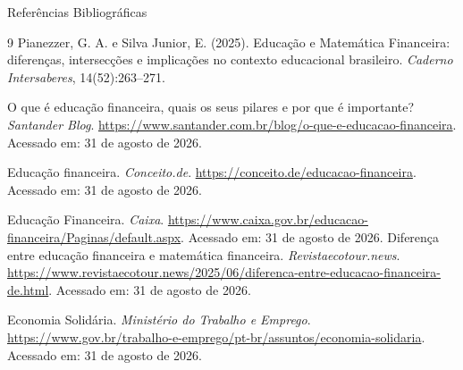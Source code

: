 \documentclass{if-beamer}
\begin{document}
\begin{frame}[allowframebreaks]{Referências Bibliográficas}
    \begin{thebibliography}{9}
        Pianezzer, G. A. e Silva Junior, E. (2025). Educação e Matemática Financeira: diferenças, intersecções e implicações no contexto educacional brasileiro. \textit{Caderno Intersaberes}, 14(52):263--271.

        O que é educação financeira, quais os seus pilares e por que é importante? \textit{Santander Blog}. \url{https://www.santander.com.br/blog/o-que-e-educacao-financeira}. Acessado em: 31 de agosto de 2026.

        Educação financeira. \textit{Conceito.de}. \url{https://conceito.de/educacao-financeira}. Acessado em: 31 de agosto de 2026.

        Educação Financeira. \textit{Caixa}. \url{https://www.caixa.gov.br/educacao-financeira/Paginas/default.aspx}. Acessado em: 31 de agosto de 2026.
%
%
        Diferença entre educação financeira e matemática financeira. \textit{Revistaecotour.news}. \url{https://www.revistaecotour.news/2025/06/diferenca-entre-educacao-financeira-de.html}. Acessado em: 31 de agosto de 2026.

%
        Economia Solidária. \textit{Ministério do Trabalho e Emprego}. \url{https://www.gov.br/trabalho-e-emprego/pt-br/assuntos/economia-solidaria}. Acessado em: 31 de agosto de 2026.

%
    \end{thebibliography}
\end{frame}
\end{document}
